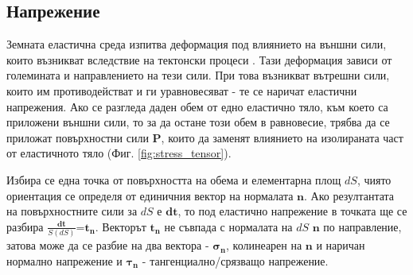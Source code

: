 \documentclass{report}
\begin{document}
	\subsection{Напрежение}
	Земната еластична среда изпитва деформация под влиянието на външни сили, които възникват вследствие на тектонски процеси \cite{geofizika_chast1}. Тази деформация зависи от големината и направлението на тези сили. При това възникват вътрешни сили, които им противодействат и ги уравновесяват - те се наричат еластични напрежения. Ако се разгледа даден обем от едно еластично тяло, към което са приложени външни сили, то за да остане този обем в равновесие, трябва да се приложат повърхностни сили $\mathbf{P}$, които да заменят влиянието на изолираната част от еластичното тяло (Фиг. \ref{fig:stress_tensor}).
	
	Избира се една точка от повърхността на обема и елементарна площ $dS$, чиято ориентация се определя от единичния вектор на нормалата $\boldsymbol{n}$. Ако резултантата на повърхностните сили за $dS$ е $\boldsymbol{dt}$, то под еластично напрежение в точката ще се разбира $\displaystyle \frac{\boldsymbol{dt}}{S(dS)}$=$\boldsymbol{t_n}$. Векторът $\boldsymbol{t_n}$ не съвпада с нормалата на $dS$ $\boldsymbol{n}$ по направление, затова може да се разбие на два вектора - $\boldsymbol{\sigma_n}$, колинеарен на $\boldsymbol{n}$ и наричан нормално напрежение и $\boldsymbol{\tau_{n}}$ - тангенциално/срязващо напрежение.
	
\end{document}
